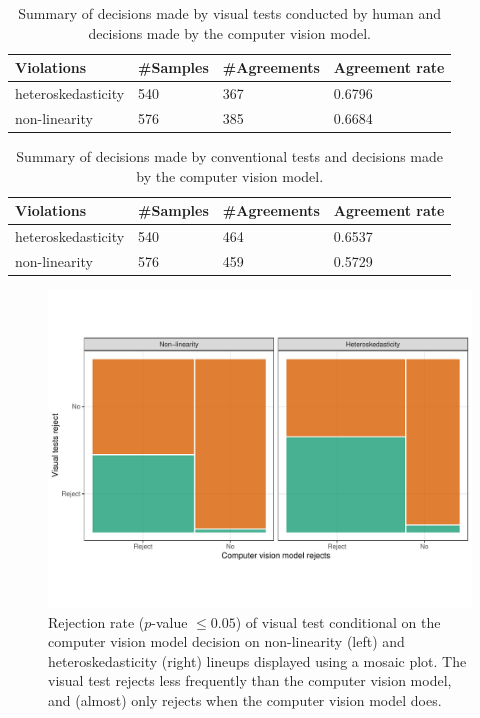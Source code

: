 \documentclass[]{interact}
\theoremstyle{plain}%
\theoremstyle{definition}
\theoremstyle{remark}
\begin{document}
\begin{table}

\caption{\label{tab:human-table}Summary of decisions made by visual tests conducted by human and decisions made by the computer vision model.}
\centering
\begin{tabular}[t]{llll}
\toprule
Violations & \#Samples & \#Agreements & Agreement rate\\
\midrule
heteroskedasticity & 540 & 367 & 0.6796\\
non-linearity & 576 & 385 & 0.6684\\
\bottomrule
\end{tabular}
\end{table}

\begin{table}

\caption{\label{tab:conv-table}Summary of decisions made by conventional tests and decisions made by the computer vision model.}
\centering
\begin{tabular}[t]{llll}
\toprule
Violations & \#Samples & \#Agreements & Agreement rate\\
\midrule
heteroskedasticity & 540 & 464 & 0.6537\\
non-linearity & 576 & 459 & 0.5729\\
\bottomrule
\end{tabular}
\end{table}

\begin{figure}[!h]

{\centering \includegraphics[width=1\linewidth]{paper_files/figure-latex/human-mosaic-1} 

}

\caption{Rejection rate ($p$-value $\leq0.05$) of visual test conditional on the computer vision model decision on non-linearity (left) and heteroskedasticity (right) lineups displayed using a mosaic plot. The visual test rejects less frequently than the computer vision model, and (almost) only rejects when the computer vision model does.}\label{fig:human-mosaic}
\end{figure}
\end{document}
